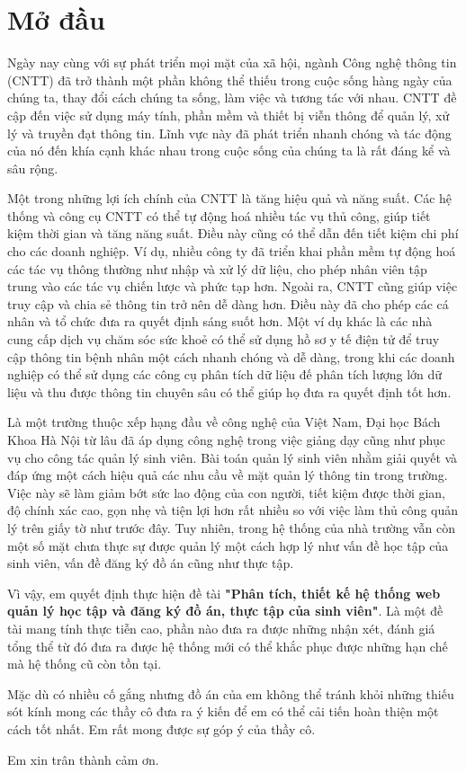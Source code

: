 \chapter*{Mở đầu}
Ngày nay cùng với sự phát triển mọi mặt của xã hội, ngành Công nghệ thông tin (CNTT) đã trở thành một phần không thể thiếu trong cuộc sống hàng ngày của chúng ta, thay đổi cách chúng ta sống, làm việc và tương tác với nhau.
CNTT đề cập đến việc sử dụng máy tính, phần mềm và thiết bị viễn thông để quản lý, xử lý và truyền đạt thông tin.
Lĩnh vực này đã phát triển nhanh chóng và tác động của nó đến khía cạnh khác nhau trong cuộc sống của chúng ta là rất đáng kể và sâu rộng.

Một trong những lợi ích chính của CNTT là tăng hiệu quả và năng suất. Các hệ thống và công cụ CNTT có thể tự động hoá nhiều tác vụ thủ công, giúp tiết kiệm thời gian và tăng năng suất.
Điều này cũng có thể dẫn đến tiết kiệm chi phí cho các doanh nghiệp. Ví dụ, nhiều công ty đã triển khai phần mềm tự động hoá các tác vụ thông thường như nhập và xử lý dữ liệu, cho phép nhân viên tập trung vào các tác vụ chiến lược và phức tạp hơn.
Ngoài ra, CNTT cũng giúp việc truy cập và chia sẻ thông tin trở nên dễ dàng hơn. Điều này đã cho phép các cá nhân và tổ chức đưa ra quyết định sáng suốt hơn. 
Một ví dụ khác là các nhà cung cấp dịch vụ chăm sóc sức khoẻ có thể sử dụng hồ sơ y tế điện tử để truy cập thông tin bệnh nhân một cách nhanh chóng và dễ dàng, trong khi các doanh nghiệp có thể sử dụng các công cụ phân tích dữ liệu đế phân tích lượng lớn dữ liệu và thu được thông tin chuyên sâu có thể giúp họ đưa ra quyết định tốt hơn.

Là một trường thuộc xếp hạng đầu về công nghệ của Việt Nam, Đại học Bách Khoa Hà Nội từ lâu đã áp dụng công nghệ trong việc giảng dạy cũng như phục vụ cho công tác quản lý sinh viên.
Bài toán quản lý sinh viên nhằm giải quyết và đáp ứng một cách hiệu quả các nhu cầu về mặt quản lý thông tin trong trường.
Việc này sẽ làm giảm bớt sức lao động của con người, tiết kiệm được thời gian, độ chính xác cao, gọn nhẹ và tiện lợi hơn rất nhiều so với việc làm thủ công quản lý trên giấy tờ như trước đây.
Tuy nhiên, trong hệ thống của nhà trường vẫn còn một số mặt chưa thực sự được quản lý một cách hợp lý như vấn đề học tập của sinh viên, vấn đề đăng ký đồ án cũng như thực tập.

Vì vậy, em quyết định thực hiện đề tài \textbf{"Phân tích, thiết kế hệ thống web quản lý học tập và đăng ký đồ án, thực tập của sinh viên"}.
Là một đề tài mang tính thực tiễn cao, phần nào đưa ra được những nhận xét, đánh giá tổng thể từ đó đưa ra được hệ thống mới có thể khắc phục được những hạn chế mà hệ thống cũ còn tồn tại.

Mặc dù có nhiều cố gắng nhưng đồ án của em không thể tránh khỏi những thiếu sót kính mong các thầy cô đưa ra ý kiến để em có thể cải tiến hoàn thiện một cách tốt nhất.
Em rất mong được sự góp ý của thầy cô.

Em xin trân thành cảm ơn.
